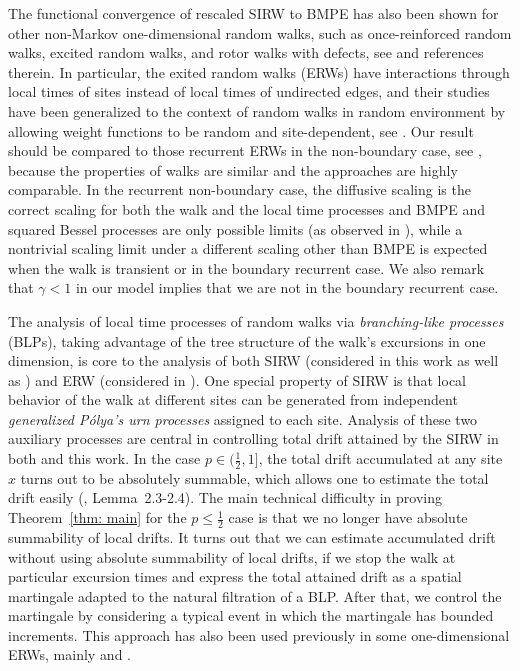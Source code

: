 \documentclass[twoside,12pt, a4paper]{article}
\numberwithin{equation}{section}
\theoremstyle{remark}
\newcommand{\comment}[1]{\textcolor{blue}{(Comment: #1)}}
\begin{document}
The functional convergence of rescaled SIRW to BMPE has also been shown for other non-Markov one-dimensional random walks,
	such as once-reinforced random walks, excited random walks, and rotor walks with defects, see \cite{Dav96,Dav99,DK12,KP16,KMP22,HLSH18} and references therein. 
	In particular, the exited random walks (ERWs) have interactions through local times of sites instead of local times of undirected edges, and their studies have been generalized to the context of random walks in random environment by allowing weight functions to be random and site-dependent, 
	see \cite{KZ13, KMP22}.
	Our result should be compared to those recurrent ERWs in the non-boundary case, see \cite{KP16,KMP23}, because the properties of walks are similar and the approaches are highly comparable. 
	In the recurrent non-boundary case, the diffusive scaling is the correct scaling for both the walk and the local time processes and BMPE and squared Bessel processes are only possible limits (as observed in \cite{T96}), while a nontrivial scaling limit under a different scaling other than BMPE is expected when the walk is transient or in the boundary recurrent case. We also remark that $\gamma<1$ in our model implies that we are not in the boundary recurrent case.


	The analysis of local time processes of random walks via \textit{branching-like processes} (BLPs), taking advantage of the tree structure of the walk's excursions in one dimension, is core to the analysis of both SIRW (considered in this work as well as \cite{T96, KMP23}) and ERW (considered in \cite{DK12, KP16, KMP22}). 
	One special property of SIRW is that local behavior of the walk at different sites can be generated from independent \textit{generalized P\'olya's urn processes} assigned to each site.
	Analysis of these two auxiliary processes are central in controlling total drift attained by the SIRW in both \cite{KMP23} and this work.
In the case $p \in (\frac{1}{2}, 1]$, the total drift accumulated at any site $x$ turns out to be absolutely summable, which allows one to estimate the total drift easily (\cite{KMP23}, Lemma~2.3-2.4).
	The main technical difficulty in proving Theorem~\ref{thm: main} for the $p \le \frac{1}{2}$ case is that we no longer have absolute summability of local drifts.
	It turns out that we can estimate accumulated drift without using absolute summability of local drifts, if we stop the walk at particular excursion times and express the total attained drift as a spatial martingale adapted to the natural filtration of a BLP. After that, we control the martingale by considering a typical event in which the martingale has bounded increments.
	This approach has also been used previously in some one-dimensional ERWs, mainly \cite{DK12} and \cite{KP16}.
	
\end{document}
